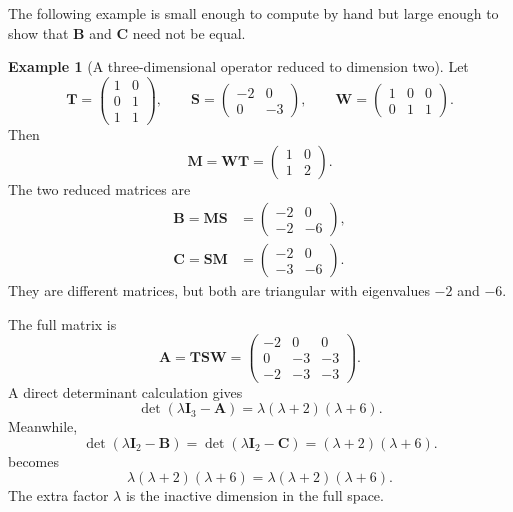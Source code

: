 \documentclass[11pt]{article}
\newcommand{\I}{\mathbf{I}}
\newcommand{\mat}[1]{\mathbf{#1}}
\theoremstyle{definition}
\newtheorem{example}[example]{Example}
\theoremstyle{remark}
\begin{document}
The following example is small enough to compute by hand but large enough to show that \(\mat{B}\) and \(\mat{C}\) need not be equal.

\begin{example}[A three-dimensional operator reduced to dimension two]
\label{ex:three-by-three}
Let
\begin{equation}
  \mat{T}=
  \begin{pmatrix}
    1&0\\
    0&1\\
    1&1
  \end{pmatrix},
  \qquad
  \mat{S}=
  \begin{pmatrix}
    -2&0\\
    0&-3
  \end{pmatrix},
  \qquad
  \mat{W}=
  \begin{pmatrix}
    1&0&0\\
    0&1&1
  \end{pmatrix}.
  \label{eq:example1-factors}
\end{equation}
Then
\begin{equation}
  \mat{M}=\mat{W}\mat{T}
  =
  \begin{pmatrix}
    1&0\\
    1&2
  \end{pmatrix}.
  \label{eq:example1-M}
\end{equation}
The two reduced matrices are
\begin{align}
  \mat{B}=\mat{M}\mat{S}
  &=
  \begin{pmatrix}
    -2&0\\
    -2&-6
  \end{pmatrix},
  \label{eq:example1-B}\\
  \mat{C}=\mat{S}\mat{M}
  &=
  \begin{pmatrix}
    -2&0\\
    -3&-6
  \end{pmatrix}.
  \label{eq:example1-C}
\end{align}
They are different matrices, but both are triangular with eigenvalues \(-2\) and \(-6\).

The full matrix is
\begin{equation}
  \mat{A}=\mat{T}\mat{S}\mat{W}
  =
  \begin{pmatrix}
    -2&0&0\\
    0&-3&-3\\
    -2&-3&-3
  \end{pmatrix}.
  \label{eq:example1-A}
\end{equation}
A direct determinant calculation gives
\begin{equation}
  \det(\lambda\I_3-\mat{A})
  =\lambda(\lambda+2)(\lambda+6).
  \label{eq:example1-charA}
\end{equation}
Meanwhile,
\begin{equation}
  \det(\lambda\I_2-\mat{B})
  =
  \det(\lambda\I_2-\mat{C})
  =(\lambda+2)(\lambda+6).
  \label{eq:example1-charBC}
\end{equation}
 becomes
\[
  \lambda(\lambda+2)(\lambda+6)
  =\lambda(\lambda+2)(\lambda+6).
\]
The extra factor \(\lambda\) is the inactive dimension in the full space.
\end{example}
\end{document}
